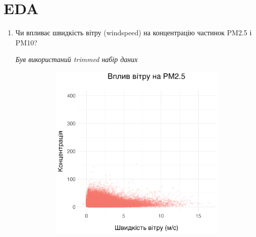 \documentclass{article}
\begin{document}
\begin{enumerate}
    
\end{enumerate}

\pagebreak

\section{EDA}

\begin{enumerate}
    \item Чи впливає швидкість вітру (windspeed) на концентрацію частинок PM2.5 і PM10?
    
    \quad \textit{Був використаний trimmed набір даних}

    \begin{figure}[h!]
        \centering
        \begin{subfigure}[b]{0.4\linewidth}
            \includegraphics[width=\linewidth]{plots/question1/wind_speed_vs_pm2_5.png}
        \end{subfigure}
        \begin{subfigure}[b]{0.4\linewidth}

\end{subfigure}
\end{figure}
\end{enumerate}
\end{document}
